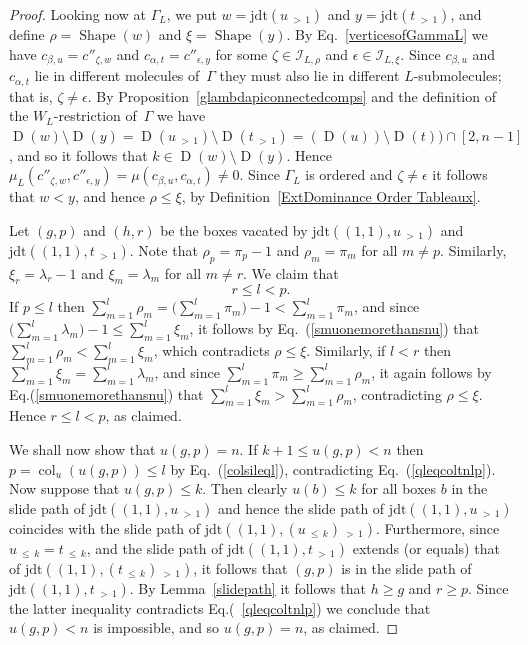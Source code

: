 \documentclass[ALCO,ThmDefs,Unicode,epreuves]{cedram}
\DeclareMathOperator{\col}{col}
\newcommand{\morethan}[2]{#1\,{_{>\,#2}}}
\newcommand{\Lessthan}[2]{#1\,{_{\leqslant\,#2}}}
\newcommand{\jdt}{\mathrm{jdt}}
\DeclareMathOperator{\shape}{Shape}
\DeclareMathOperator{\D}{D}
\begin{document}
\begin{proof}
Looking now at $\Gamma_L$, we put $w=\jdt(\morethan u1)$ and $y=\jdt(\morethan t1)$,
and define $\rho=\shape(w)$ and $\xi=\shape (y)$.
By Eq.~\eqref{verticesofGammaL} we have $c_{\beta,u}=c''_{\zeta,w}$ and
$c_{\alpha,t}=c''_{\epsilon,y}$ for some $\zeta\in\mathcal{I}_{L,\rho}$ and
$\epsilon\in\mathcal{I}_{L,\xi}$. Since $c_{\beta,u}$ and $c_{\alpha,t}$
lie in different molecules of~$\Gamma$ they must also lie in different
$L$-submolecules; that is, $\zeta\ne\epsilon$. By
Proposition~\ref{glambdapiconnectedcomps} and the definition of the $W_L$-restriction
of~$\Gamma$ we have $\D(w)\setminus\D(y)=\D(\morethan u1)\setminus\D(\morethan t1)=
(\D(u))\setminus\D(t))\cap[2,n-1]$, and so it follows that $k\in\D(w)\setminus\D(y)$.
Hence $\mu_L(c''_{\zeta,w},c''_{\epsilon,y})=\mu(c_{\beta,u},c_{\alpha,t})\neq 0$.
Since $\Gamma_L$ is ordered and $\zeta\neq\epsilon$
it follows that $w<y$, and hence $\rho\leqslant\xi$,
by Definition~\ref{ExtDominance Order Tableaux}.

Let $(g,p)$ and $(h,r)$ be the boxes vacated by $\jdt((1,1),\morethan u1)$
and $\jdt((1,1),\morethan t1)$. Note that $\rho_p=\pi_p-1$ and $\rho_m=\pi_m$
for all $m\ne p$. Similarly, $\xi_r=\lambda_r-1$ and $\xi_m=\lambda_m$ for
all $m\ne r$. We claim that
\begin{equation}\label{qleqcoltnlp}
r\leqslant l<p.
\end{equation}
If $p\leqslant l$ then
$\sum_{m=1}^l \rho_m =\bigl(\sum_{m=1}^l \pi_m\bigr)-1<\sum_{m=1}^l \pi_m$,
and since $\bigl(\sum_{m=1}^l \lambda_m\bigr) - 1\leqslant\sum_{m=1}^l\xi_m$,
it follows by Eq.~(\ref{smuonemorethansnu}) that
$\sum_{m=1}^l \rho_m <\sum_{m=1}^l\xi_m$, which contradicts $\rho\leqslant\xi$.
Similarly, if $l<r$ then $\sum_{m=1}^l \xi_m = \sum_{m=1}^l \lambda_m$,
and since $\sum_{m=1}^l \pi_m \geqslant \sum_{m=1}^l \rho_m$, it again follows by
Eq.(\ref{smuonemorethansnu}) that $\sum_{m=1}^l \xi_m > \sum_{m=1}^l \rho_m$,
contradicting $\rho\leqslant\xi$. Hence $r\leqslant l<p$, as claimed.

We shall now show that $u(g,p)=n$.
If $k+1\leqslant u(g,p)<n$ then $p=\col_u(u(g,p))\leqslant l$ by Eq.~(\ref{colsileql}),
contradicting Eq.~(\ref{qleqcoltnlp}). Now suppose that $u(g,p)\leqslant k$. Then
clearly $u(b)\leqslant k$ for all boxes $b$ in the slide path of $\jdt((1,1),\morethan u1)$
and hence the slide path of $\jdt((1,1),\morethan u1)$ coincides with the
slide path of $\jdt((1,1),\morethan{(\Lessthan uk)}1)$. Furthermore, since
$\Lessthan uk=\Lessthan tk$, and the slide path of $\jdt((1,1),\morethan t1)$
extends (or equals) that of $\jdt((1,1),\morethan{(\Lessthan tk)}1)$, it follows that
$(g,p)$ is in the slide path of $\jdt((1,1),\morethan t1)$. By Lemma~\ref{slidepath}
it follows that $h\geqslant g$ and $r\geqslant p$. Since the latter inequality
contradicts Eq.(~\ref{qleqcoltnlp}) we conclude that $u(g,p)<n$ is impossible, and
so $u(g,p)=n$, as claimed.


\end{proof}
\end{document}
